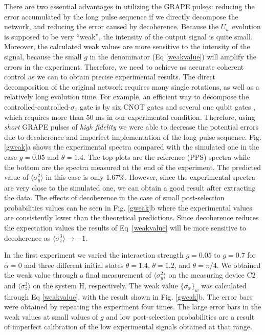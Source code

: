 \documentclass[aps,pra,12pt,onecolumn,showpacs,superscriptaddress,floatfix,footinbib,subfigure]{revtex4}
\begin{document}
There are two essential advantages in utilizing the GRAPE pulses: reducing the error accumulated by the long pulse sequence if we directly decompose the network, and reducing the error caused by  decoherence. Because the $U_w$ evolution is supposed to be very ``weak'', the intensity of the output signal is quite small. Moreover, the calculated weak values are more sensitive to the intensity of the signal, because the small $g$  in the denominator (Eq \ref{weakvalue}) will amplify the errors in the experiment. Therefore, we need to achieve as accurate coherent control as we can to obtain precise experimental results. The direct decomposition of the original network requires many single rotations, as well as a relatively long evolution time. For example, an efficient way to decompose the controlled-controlled-$\sigma_z$ gate is by six CNOT gates and several one qubit gates \cite{NielsenandChuang}, which requires more than 50 ms in our experimental condition. Therefore, using \emph{short} GRAPE pulses of \emph{high fidelity} we were able to decrease the potential errors  due to decoherence and imperfect implementation of the long pulse sequence.  Fig. \ref{gweak}a shows  the experimental spectra compared with the simulated one in the case $g=0.05$ and $\theta = 1.4$. The top plots are the reference (PPS) spectra while the bottom are the spectra measured at the end of the experiment. The predicted value of $\langle \sigma_y^2 \rangle$ in this case is only 1.67\%. However, since the experimental spectra are very close to the simulated one, we can obtain a good result after extracting the data. The effects of decoherence in the case of small post-selection probabilities values can be seen in Fig. \ref{gweak}b where the experimental values  are consistently lower than the theoretical predictions. Since decoherence reduces the expectation values the results of   Eq~\eqref{weakvalue} will be more sensitive to decoherence as $\langle\sigma_z^3\rangle\rightarrow - 1$.

In the first experiment we varied the interaction strength   $g=0.05$ to $g = 0.7$ for $\alpha=0$ and three different initial states $\theta = 1.4$, $\theta = 1.2$, and $\theta =\pi/4$. We obtained the weak value through a final measurement of  $\langle \sigma_y^2 \rangle$ on the measuring device C2 and $\langle \sigma_z^3 \rangle$ on the system H, respectively. The weak value $\{ \sigma_x \}_w$  was calculated through Eq \eqref{weakvalue}, with the result shown in Fig. \ref{gweak}b. The error bars were  obtained by repeating the experiment  four times. The large error bars in the weak values at small values of  $g$ and low post-selection probabilities  are a result of imperfect calibration of the low experimental signals obtained at that range.
\end{document}

